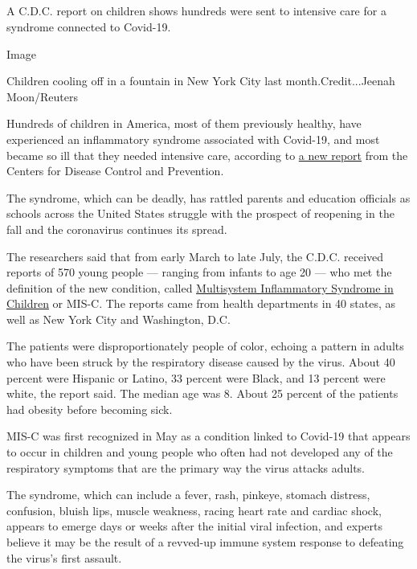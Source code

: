\hypertarget{section-6}{%
\subsection{}\label{section-6}}

A C.D.C. report on children shows hundreds were sent to intensive care
for a syndrome connected to Covid-19.

Image

Children cooling off in a fountain in New York City last
month.Credit...Jeenah Moon/Reuters

Hundreds of children in America, most of them previously healthy, have
experienced an inflammatory syndrome associated with Covid-19, and most
became so ill that they needed intensive care, according to
\href{https://www.cdc.gov/mmwr/volumes/69/wr/mm6932e2.htm?s_cid=mm6932e2_w\#T1_down}{a
new report} from the Centers for Disease Control and Prevention.

The syndrome, which can be deadly, has rattled parents and education
officials as schools across the United States struggle with the prospect
of reopening in the fall and the coronavirus continues its spread.

The researchers said that from early March to late July, the C.D.C.
received reports of 570 young people --- ranging from infants to age 20
--- who met the definition of the new condition, called
\href{https://www.nytimes.com/2020/05/17/health/coronavirus-multisystem-fnflammatory-syndrome-children-teenagers.html}{Multisystem
Inflammatory Syndrome in Children} or MIS-C. The reports came from
health departments in 40 states, as well as New York City and
Washington, D.C.

The patients were disproportionately people of color, echoing a pattern
in adults who have been struck by the respiratory disease caused by the
virus. About 40 percent were Hispanic or Latino, 33 percent were Black,
and 13 percent were white, the report said. The median age was 8. About
25 percent of the patients had obesity before becoming sick.

MIS-C was first recognized in May as a condition linked to Covid-19 that
appears to occur in children and young people who often had not
developed any of the respiratory symptoms that are the primary way the
virus attacks adults.

The syndrome, which can include a fever, rash, pinkeye, stomach
distress, confusion, bluish lips, muscle weakness, racing heart rate and
cardiac shock, appears to emerge days or weeks after the initial viral
infection, and experts believe it may be the result of a revved-up
immune system response to defeating the virus's first assault.

